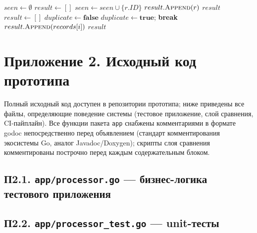\documentclass[12pt,a4paper]{article}
\numberwithin{equation}{section}
\begin{document}
\begin{algorithm}[htbp]
\caption{Deduplicate --- эталонная ($O(n)$) и регрессионная ($O(n^2)$) реализации}
\label{alg:dedup}
\begin{algorithmic}[1]
 
  \State $seen \gets \emptyset$ 
  \State $result \gets []$
      \State $seen \gets seen \cup \{r.ID\}$
      \State $result.\Call{Append}{r}$
    \EndIf
  \EndFor
  \State \Return $result$
\EndFunction
\Statex
{} 
  \State $result \gets []$
    \State $duplicate \gets \textbf{false}$
     
        \State $duplicate \gets \textbf{true}$; \textbf{break}
      \EndIf
    \EndFor
      \State $result.\Call{Append}{records[i]}$
    \EndIf
  \EndFor
  \State \Return $result$
\EndFunction
\end{algorithmic}
\end{algorithm}

\clearpage
\section*{Приложение 2. Исходный код прототипа}
\label{app:code}

Полный исходный код доступен в репозитории прототипа; ниже приведены все
файлы, определяющие поведение системы (тестовое приложение, слой сравнения,
CI-пайплайн). Все функции пакета \texttt{app} снабжены комментариями в
формате godoc непосредственно перед объявлением (стандарт комментирования
экосистемы Go, аналог Javadoc/Doxygen); скрипты слоя сравнения
комментированы построчно перед каждым содержательным блоком.

\subsection*{П2.1. \texttt{app/\allowbreak processor.go} --- бизнес-логика тестового приложения}


\subsection*{П2.2. \texttt{app/\allowbreak processor\_test.go} --- unit-тесты}

\end{document}

